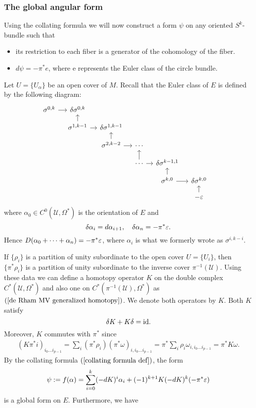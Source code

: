 \subsubsection{The global angular form}
Using the collating formula we will now construct a form $\psi$ on any oriented $S^k$-bundle such that
\begin{itemize}
\item its restriction to each fiber is a generator of the cohomology of the fiber.
\item $d\psi=-\pi^*e$, where e represents the Euler class of the circle bundle.
\end{itemize}
Let $U=\{U_\alpha\}$ be an open cover of $M$. Recall that the Euler class of $E$ is defined by the following diagram:
\[\begin{tikzcd}[row sep=1.0 em,column sep=1.0em]
\sigma^{0,k}\ar[r]&\delta\sigma^{0,k}&&&&&\\
&\sigma^{1,k-1}\ar[u]\ar[r]&\delta\sigma^{1,k-1}&&&&\\
&&\sigma^{2,k-2}\ar[r]\ar[u]&\cdots&&&\\
&&&\cdots\ar[u]\ar[r]&\delta\sigma^{k-1,1}&&\\
&&&&\sigma^{k,0}\ar[u]\ar[r]&\delta\sigma^{k,0}\\
&&&&&-\eps\ar[u]
\end{tikzcd}\]
where $\alpha_0\in C^0(\mathcal{U},\Omega^*)$ is the orientation of $E$ and
\[\delta\alpha_i=d\alpha_{i+1},\quad\delta\alpha_n=-\pi^*\varepsilon.\]
Hence $D(\alpha_0+\dots+\alpha_n)=-\pi^*\varepsilon$, where $\alpha_i$ is what we formerly wrote as $\sigma^{i,k-i}$.\par
If $\{\rho_i\}$ is a partition of unity subordinate to the open cover $U=\{U_i\}$, then $\{\pi^*\rho_i\}$ is a partition of unity subordinate to the 
inverse cover $\pi^{-1}(\mathcal{U})$. Using these data we can define a homotopy operator $K$ on the double complex $C^*(\mathcal{U},\Omega^*)$ and also one on 
$C^*(\pi^{-1}(\mathcal{U}),\Omega^*)$ as $(\ref{de Rham MV generalized homotopy})$. We denote both operators by $K$. Both $K$ satisfy
\[\delta K+K\delta=\mathrm{id}.\]
Moreover, $K$ commutes with $\pi^*$ since
\begin{align*}
(K\pi^*i)_{i_0\dots i_{p-1}}=\sum_i(\pi^*\rho_i)(\pi^*\omega)_{i,i_0\dots i_{p-1}}=\pi^*\sum_i\rho_i\omega_{i,i_0\dots i_{p-1}}=\pi^*K\omega.
\end{align*}
By the collating formula $(\ref{collating formula def})$, the form
\[\psi:=f(\alpha)=\sum_{i=0}^{k}(-dK)^i\alpha_i+(-1)^{k+1}K(-dK)^k(-\pi^*\varepsilon)\]
is a global form on $E$. Furthermore, we have
